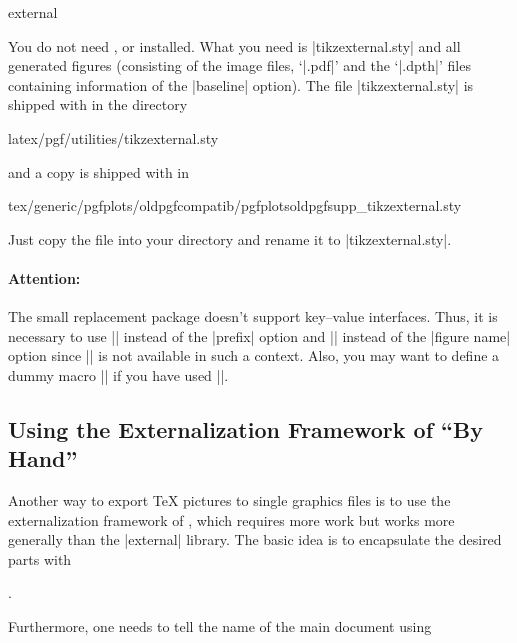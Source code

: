 {\begin{pgfplotslibrary}{external}
\begin{codeexample}
\end{codeexample}
    You do not need \pgfname{}, \tikzname{} or \PGFPlots{} installed. What you
    need is |tikzexternal.sty| and all generated figures (consisting of the
    image files, `|.pdf|' and the `|.dpth|' files containing information of the
    |baseline| option). The file |tikzexternal.sty| is shipped with \pgfname{}
    in the directory
\begin{codeexample}
latex/pgf/utilities/tikzexternal.sty
\end{codeexample}
    and a copy is shipped with \PGFPlots{} in
\begin{codeexample}
tex/generic/pgfplots/oldpgfcompatib/pgfplotsoldpgfsupp_tikzexternal.sty
\end{codeexample}
    Just copy the file into your directory and rename it to |tikzexternal.sty|.


    \paragraph{Attention:}

    The small replacement package doesn't support key--value interfaces. Thus,
    it is necessary to use || instead of the |prefix|
    option and || instead of the |figure name| option since
    |\tikzset| is not available in such a context. Also, you may want to define
    a dummy macro |\pgfplotsset| if you have used |\pgfplotsset|.
\end{pgfplotslibrary}


\subsection[Using the Externalization Framework of PGF By Hand]
           {Using the Externalization Framework of {\normalfont\pgfname} ``By Hand''}

Another way to export \TeX{} pictures to single graphics files is to use the
externalization framework of \pgfname{}, which requires more work but works
more generally than the |external| library. The basic idea is to encapsulate
the desired parts with

\declareandlabel{\beginpgfgraphicnamed}


\declareandlabel{\endpgfgraphicnamed}.

\noindent Furthermore, one needs to tell \pgfname{} the name of the main
document using

}

